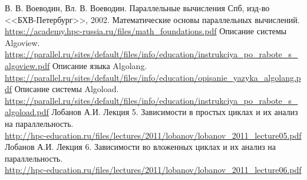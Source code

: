 \documentclass[12pt, fleqn]{article}
\theoremstyle{definition}
\begin{document}
\newpage
\begin{thebibliography}{}
 В. В. Воеводин, Вл. В. Воеводин. Параллельные вычисления Спб, изд-во <<БХВ-Петербург>>, 2002.
 Математические основы параллельных вычислений. \\ \url{https://academy.hpc-russia.ru/files/math_foundations.pdf}
 Описание системы Algoview.\\ \url{https://parallel.ru/sites/default/files/info/education/instrukciya_po_rabote_s_algoview.pdf}
 Описание языка Algolang. \\ \url{https://parallel.ru/sites/default/files/info/education/opisanie_yazyka_algolang.pdf}
 Описание системы Algoload.\\ \url{https://parallel.ru/sites/default/files/info/education/instrukciya_po_rabote_s_algoload.pdf}
 Лобанов А.И. Лекция 5. Зависимости в простых циклах и их анализ на параллельность. \\ \url{http://hpc-education.ru/files/lectures/2011/lobanov/lobanov_2011_lecture05.pdf}
 Лобанов А.И. Лекция 6. Зависимости во вложенных циклах и их анализ на параллельность. \\ \url{http://hpc-education.ru/files/lectures/2011/lobanov/lobanov_2011_lecture06.pdf}
\end{thebibliography}
\end{document}
